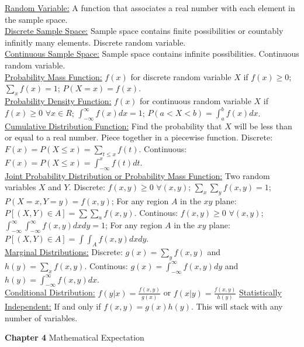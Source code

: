 \documentclass[9pt]{article}
\begin{document}
        \begin{multicols}{2}
            \noindent\underline{Random Variable:} A function that associates a real number with each element in the sample space.\\
            \underline{Discrete Sample Space:} Sample space contains finite possibilities or countably infinitly many elements. Discrete random variable.\\
            \underline{Continuous Sample Space:} Sample space contains infinite possibilities. Continuous random variable.\\
            \underline{Probability Mass Function:} $f(x)$ for discrete random variable $X$ if $f(x) \geq 0$; $\sum_xf(x) = 1$; $P(X=x) = f(x)$.\\
            \underline{Probability Density Function:} $f(x)$ for continuous random variable $X$ if $f(x)\geq 0$ $\forall x\in R$; $\int_{-\infty}^{\infty}f(x)dx = 1$; $P(a<X<b) = \int_a^bf(x)dx$.
            \underline{Cumulative Distribution Function:} Find the probability that $X$ will be less than or equal to a real number. Piece together in a piecewise function. Discrete: $F(x) = P(X\leq x) = \sum_{t\leq x}f(t)$. Continuous: $F(x) = P(X\leq x) = \int_{-\infty}^{x}f(t)dt$.\\
            \underline{Joint Probability Distribution or Probability Mass Function:} Two random variables $X$ and $Y$. Discrete: $f(x,y)\geq 0$ $\forall(x,y)$; $\sum_x\sum_yf(x,y) = 1$; $P(X=x,Y=y)=f(x,y)$; For any region $A$ in the $xy$ plane: $P[(X,Y)\in A]=\sum\sum_af(x,y)$. Continous: $f(x,y)\geq 0$ $\forall(x,y)$; $\int_{-\infty}^{\infty}\int_{-\infty}^{\infty}f(x,y)dxdy=1$; For any region $A$ in the $xy$ plane: $P[(X,Y)\in A]=\int\int_Af(x,y)dxdy$.\\
            \underline{Marginal Distributions:} Discrete: $g(x) = \sum_yf(x,y)$ and $h(y)=\sum_xf(x,y)$. Continous: $g(x) = \int_{-\infty}^{\infty}f(x,y)dy$ and $h(y)=\int_{-\infty}^{\infty}f(x,y)dx$.\\
            \underline{Conditional Distribution:} $f(y|x)=\frac{f(x,y)}{g(x)}$ or $f(x|y)=\frac{f(x,y)}{h(y)}$
            \underline{Statistically Independent:} If and only if $f(x,y) = g(x)h(y)$. This will stack with any number of variables.
        \end{multicols}
    \noindent\textbf{Chapter 4} Mathematical Expectation
\end{document}
